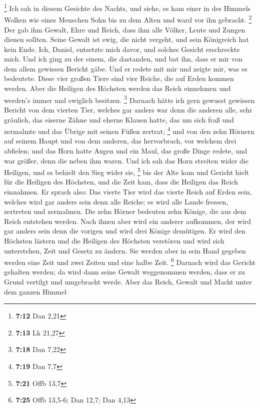 \footnote{\textbf{7:12} Dan 2,21}  Ich sah in diesem
Gesichte des Nachts, und siehe, es kam einer in des Himmels Wolken wie
eines Menschen Sohn bis zu dem Alten und ward vor ihn gebracht.
\footnote{\textbf{7:13} Lk 21,27}  Der gab ihm Gewalt,
Ehre und Reich, dass ihm alle Völker, Leute und Zungen dienen sollten.
Seine Gewalt ist ewig, die nicht vergeht, und sein Königreich hat kein
Ende.  Ich, Daniel, entsetzte mich davor, und solches
Gesicht erschreckte mich.  Und ich ging zu der einem, die
dastanden, und bat ihn, dass er mir von dem allem gewissen Bericht gäbe.
Und er redete mit mir und zeigte mir, was es bedeutete. 
Diese vier großen Tiere sind vier Reiche, die auf Erden kommen werden.
 Aber die Heiligen des Höchsten werden das Reich
einnehmen und werden's immer und ewiglich besitzen. \footnote{\textbf{7:18}
  Dan 7,22}  Darnach hätte ich gern gewusst gewissen
Bericht von dem vierten Tier, welches gar anders war denn die anderen
alle, sehr gräulich, das eiserne Zähne und eherne Klauen hatte, das um
sich fraß und zermalmte und das Übrige mit seinen Füßen zertrat;
\footnote{\textbf{7:19} Dan 7,7}  und von den zehn
Hörnern auf seinem Haupt und von dem anderen, das hervorbrach, vor
welchem drei abfielen; und das Horn hatte Augen und ein Maul, das große
Dinge redete, und war größer, denn die neben ihm waren. 
Und ich sah das Horn streiten wider die Heiligen, und es behielt den
Sieg wider sie, \footnote{\textbf{7:21} Offb 13,7}  bis
der Alte kam und Gericht hielt für die Heiligen des Höchsten, und die
Zeit kam, dass die Heiligen das Reich einnahmen.  Er
sprach also: Das vierte Tier wird das vierte Reich auf Erden sein,
welches wird gar anders sein denn alle Reiche; es wird alle Lande
fressen, zertreten und zermalmen.  Die zehn Hörner
bedeuten zehn Könige, die aus dem Reich entstehen werden. Nach ihnen
aber wird ein anderer aufkommen, der wird gar anders sein denn die
vorigen und wird drei Könige demütigen.  Er wird den
Höchsten lästern und die Heiligen des Höchsten verstören und wird sich
unterstehen, Zeit und Gesetz zu ändern. Sie werden aber in sein Hand
gegeben werden eine Zeit und zwei Zeiten und eine halbe Zeit.
\footnote{\textbf{7:25} Offb 13,5-6; Dan 12,7; Dan 4,13} 
Darnach wird das Gericht gehalten werden; da wird dann seine Gewalt
weggenommen werden, dass er zu Grund vertilgt und umgebracht werde.
 Aber das Reich, Gewalt und Macht unter dem ganzen Himmel
